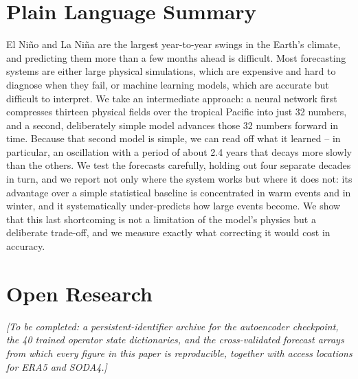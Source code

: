 \documentclass[11pt]{article}
\begin{document}
\section*{Plain Language Summary}
El Ni\~no and La Ni\~na are the largest year-to-year swings in the Earth's climate, and
predicting them more than a few months ahead is difficult. Most forecasting systems are either
large physical simulations, which are expensive and hard to diagnose when they fail, or machine
learning models, which are accurate but difficult to interpret. We take an intermediate
approach: a neural network first compresses thirteen physical fields over the tropical Pacific
into just 32 numbers, and a second, deliberately simple model advances those 32 numbers forward
in time. Because that second model is simple, we can read off what it learned -- in particular,
an oscillation with a period of about 2.4 years that decays more slowly than the others. We
test the forecasts carefully, holding out four separate decades in turn, and we report not only
where the system works but where it does not: its advantage over a simple statistical baseline
is concentrated in warm events and in winter, and it systematically under-predicts how large
events become. We show that this last shortcoming is not a limitation of the model's physics
but a deliberate trade-off, and we measure exactly what correcting it would cost in accuracy.







\section*{Open Research}
\textit{[To be completed: a persistent-identifier archive for the autoencoder checkpoint, the
40 trained operator state dictionaries, and the cross-validated forecast arrays from which
every figure in this paper is reproducible, together with access locations for ERA5 and
SODA4.]}



\end{document}
